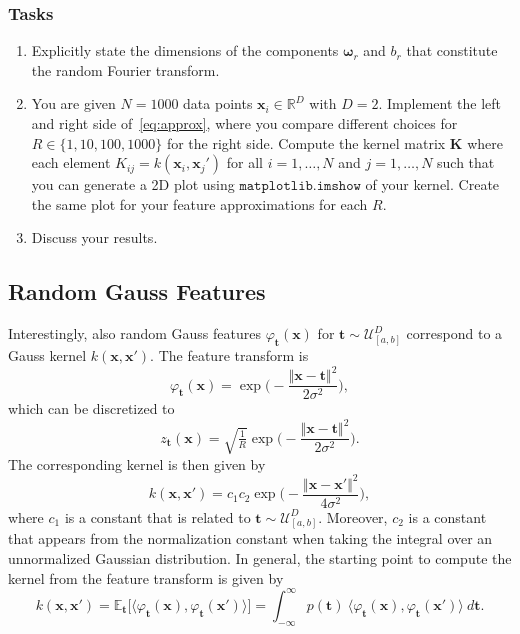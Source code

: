 \documentclass{article}
\renewcommand{\vec}[1]{\textbf{#1}}
\renewcommand{\vec}[1]{\textbf{#1}}
\newcommand{\mat}[1]{\textbf{#1}}
\begin{document}
\subsubsection*{Tasks}
\begin{enumerate}
    \item Explicitly state the dimensions of the components $\boldsymbol \omega_r$ and $b_r$ that constitute the random Fourier transform. 
    \item You are given $N=1000$ data points $\vec x_i \in \mathbb{R}^D$ with $D=2$. Implement the left and right side of~\eqref{eq:approx}, where you compare different choices for $R \in \{1,10,100,1000\}$ for the right side. Compute the kernel matrix $\mat K$ where each element $K_{ij} = k(\vec x_i, \vec x_j')$ for all $i=1,\dots,N$ and $j=1,\dots,N$ such that you can generate a 2D plot using $\texttt{matplotlib.imshow}$ of your kernel. Create the same plot for your feature approximations for each $R$. 
    \item Discuss your results.
\end{enumerate}


\subsection{Random Gauss Features}
Interestingly, also random Gauss features $\varphi_{\vec t}(\vec x)$ for $\vec t \sim \mathcal{U}^D_{[a,b]}$ correspond to a Gauss kernel $k(\vec x, \vec x')$. The feature transform is
\[
\varphi_{\vec t } (\vec x) = \exp \big ( -\frac{\Vert \vec x - \vec t\Vert^2}{2\sigma^2} \big ), 
\]
which can be discretized to
\begin{equation}\label{eq:randGaussfeat}
z_{\vec t}(\vec x) = \sqrt{\tfrac{1}{R}} \exp \big (-\frac{\Vert \vec x - \vec t \Vert^2}{2\sigma^2}\big ).
\end{equation}
The corresponding kernel is then given by
\begin{equation}
k(\vec x, \vec x') = c_1 c_2 \exp \big (-\frac{\Vert \vec x - \vec x' \Vert^2}{4\sigma^2}\big ),
\end{equation}
where $c_1$ is a constant that is related to $\vec t \sim \mathcal{U}^D_{[a,b]}$. Moreover, $c_2$ is a constant that appears from the normalization constant when taking the integral over an unnormalized Gaussian distribution. 
In general, the starting point to compute the kernel from the feature transform is given by
\begin{equation}\label{eq:start_feat_to_kernel}
k(\vec x , \vec x') = \mathbb{E}_{\vec t} \big [ \langle \varphi_{\vec t}(\vec x),\varphi_{\vec t}(\vec x') \rangle \big ] = \int_{-\infty}^\infty p(\vec t)~ \langle \varphi_{\vec t}(\vec x),\varphi_{\vec t}(\vec x') \rangle ~d{\vec t}.
\end{equation}
\end{document}
